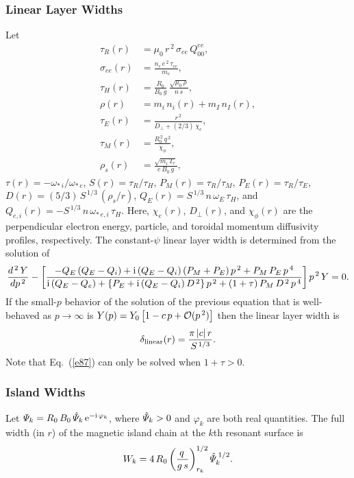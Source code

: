 \documentclass[12pt,prb,aps]{revtex4-1}
\begin{document}
\subsubsection{Linear Layer Widths}\label{linear}
Let
\begin{align}
\tau_R(r) &= \mu_0\,r^{\,2}\,\sigma_{ee}\,Q_{00}^{ee},\\[0.5ex]
\sigma_{ee}(r) &=\frac{n_e\,e^{\,2}\,\tau_{ee}}{m_e},\\[0.5ex]
\tau_H(r) &= \frac{R_0}{B_0\,g}\,\frac{\sqrt{\mu_0\,\rho}}{n\,s},\\[0.5ex]
\rho(r)&= m_i\,n_i(r)  + m_I\,n_I(r),\\[0.5ex]
\tau_E(r) &= \frac{r^{\,2}}{D_\perp + (2/3)\,\chi_e},\\[0.5ex]
\tau_M(r) &= \frac{R_0^{\,2}\,q^{\,2}}{\chi_\phi},\\[0.5ex]
\rho_s (r)&= \frac{\sqrt{m_i\,T_e}}{e\,B_0\,g},
\end{align}
$\tau(r) = -\omega_{\ast\,i}/\omega_{\ast\,e}$,
$S(r) = \tau_R/\tau_H$, 
$P_M(r) = \tau_R/\tau_M$,
$P_E(r) = \tau_R/\tau_E$,
$D(r)= (5/3)\,S^{\,1/3}\,(\rho_s/r)$,
$Q_E(r)= S^{\,1/3}\,n\,\omega_E\,\tau_H$, and 
$Q_{e,i}(r)= -S^{\,1/3}\,n\,\omega_{\ast\,e,i}\,\tau_H$. 
Here, $\chi_e(r)$, $D_\perp(r)$, and $\chi_\phi(r)$ are the perpendicular electron energy, particle,
and toroidal momentum diffusivity profiles, respectively. 
The constant-$\psi$ linear layer width is determined from the solution of\,\cite{cole,cole1}
\begin{equation}\label{e87}
\frac{d^{\,2}\,Y}{dp^{\,2}} -\left[\frac{-Q_E\,(Q_E-Q_i)+{\rm i}\,(Q_E-Q_i)\,(P_M+P_E)\,p^{\,2}+
P_M\,P_E\,p^{\,4}}
{{\rm i}\,(Q_E-Q_e) +\{P_E + {\rm i}\,(Q_E-Q_i)\,D^{\,2}\}\,p^{\,2}+(1+\tau)\,P_M\,D^{\,2}\,p^{\,4}}
\right] p^{\,2}\, Y = 0.
\end{equation}
If the small-$p$ behavior of  the solution of the previous equation that is well-behaved as $p\rightarrow \infty$ is
$Y(p) = Y_0\left[1 - c\,p+{\cal O}(p^{\,2})\right]$
then the 
linear layer width is 
\begin{equation}
\delta_{\rm linear}(r) = \frac{\pi\,|c|\,r}{S^{\,1/3}}.
\end{equation}
Note that Eq.~(\ref{e87}) can only be solved when $1+\tau>0$. 

\subsubsection{Island Widths}
Let ${\mit\Psi}_k= R_0\,B_0\,\hat{\mit\Psi}_k\,{\rm e}^{-{\rm i}\,\varphi_k}$, where $\hat{\mit\Psi}_k>0$  and $\varphi_k$ are both real quantities.
The full width (in $r$) of the magnetic island chain at the
$k$th resonant surface is\,\cite{rftor}
\begin{equation}
W_k = 4\,R_0\left(\frac{q\,}{g\,s}\right)^{1/2}_{r_k}\hat{\mit\Psi}_k^{\,1/2}.
\end{equation}
\end{document}
